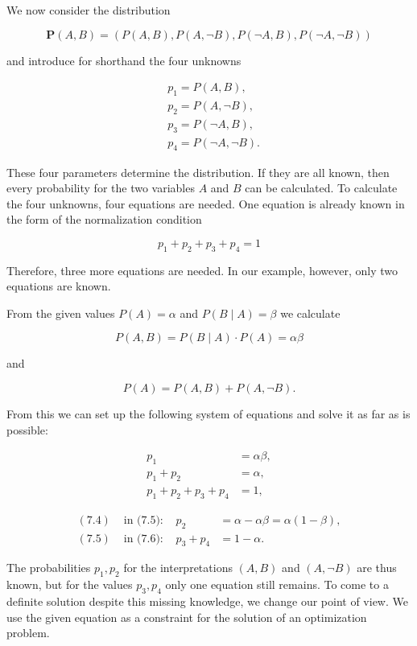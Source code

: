 \documentclass[10pt]{book}
\begin{document}
We now consider the distribution

$$
\boldsymbol{P}(A, B)=(P(A, B), P(A, \neg B), P(\neg A, B), P(\neg A, \neg B))
$$

and introduce for shorthand the four unknowns

$$
\begin{aligned}
& p_{1}=P(A, B), \\
& p_{2}=P(A, \neg B), \\
& p_{3}=P(\neg A, B), \\
& p_{4}=P(\neg A, \neg B) .
\end{aligned}
$$

These four parameters determine the distribution. If they are all known, then every probability for the two variables $A$ and $B$ can be calculated. To calculate the four unknowns, four equations are needed. One equation is already known in the form of the normalization condition

$$
p_{1}+p_{2}+p_{3}+p_{4}=1
$$

Therefore, three more equations are needed. In our example, however, only two equations are known.

From the given values $P(A)=\alpha$ and $P(B \mid A)=\beta$ we calculate

$$
P(A, B)=P(B \mid A) \cdot P(A)=\alpha \beta
$$

and

$$
P(A)=P(A, B)+P(A, \neg B) .
$$

From this we can set up the following system of equations and solve it as far as is possible:


\begin{align*}
p_{1} & =\alpha \beta,  \tag{7.4}\\
p_{1}+p_{2} & =\alpha,  \tag{7.5}\\
p_{1}+p_{2}+p_{3}+p_{4} & =1, \tag{7.6}
\end{align*}



\begin{align*}
(7.4) & \text { in (7.5): } & p_{2} & =\alpha-\alpha \beta=\alpha(1-\beta),  \tag{7.7}\\
(7.5) & \text { in (7.6): } & p_{3}+p_{4} & =1-\alpha . \tag{7.8}
\end{align*}


The probabilities $p_{1}, p_{2}$ for the interpretations $(A, B)$ and $(A, \neg B)$ are thus known, but for the values $p_{3}, p_{4}$ only one equation still remains. To come to a definite solution despite this missing knowledge, we change our point of view. We use the given equation as a constraint for the solution of an optimization problem.
\end{document}
